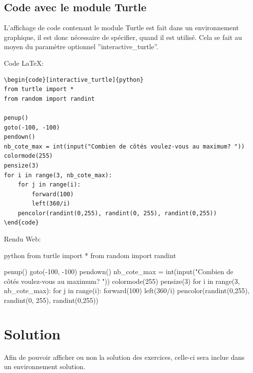 \documentclass[a4paper,11pt]{article}
\begin{document}
\subsection{Code avec le module Turtle}
L’affichage de code contenant le module Turtle est fait dans un environnement graphique, il est
donc nécessaire de spécifier, quand il est utilisé. Cela se fait au moyen du paramètre optionnel
”interactive_turtle”.\par

Code LaTeX:
\begin{lstlisting}
\begin{code}[interactive_turtle]{python}
from turtle import *
from random import randint

penup()
goto(-100, -100)
pendown()
nb_cote_max = int(input("Combien de côtés voulez-vous au maximum? "))
colormode(255)
pensize(3)
for i in range(3, nb_cote_max):
    for j in range(i):
        forward(100)
        left(360/i)
    pencolor(randint(0,255), randint(0, 255), randint(0,255))
\end{code}
\end{lstlisting}

Rendu Web:\par
\begin{code}{python}
from turtle import *
from random import randint

penup()
goto(-100, -100)
pendown()
nb_cote_max = int(input("Combien de côtés voulez-vous au maximum? "))
colormode(255)
pensize(3)
for i in range(3, nb_cote_max):
    for j in range(i):
        forward(100)
        left(360/i)
    pencolor(randint(0,255), randint(0, 255), randint(0,255))
\end{code}

\section{Solution}
Afin de pouvoir afficher ou non la solution des exercices, celle-ci sera inclue dans un environnement solution.\par
\end{document}
